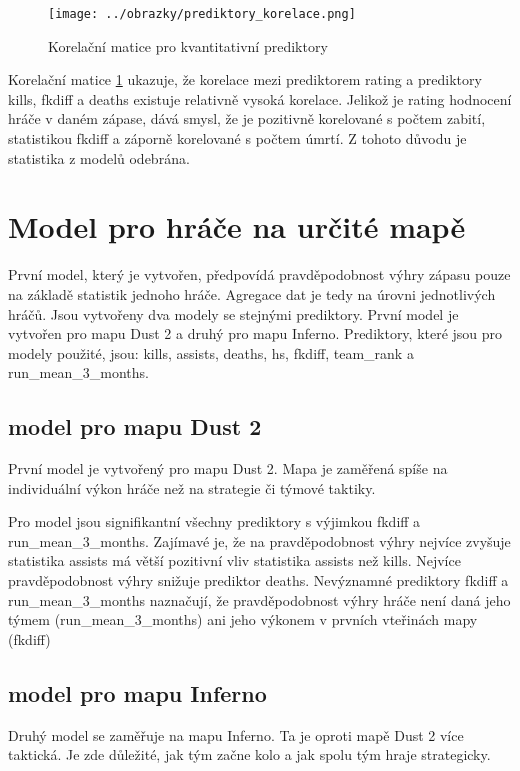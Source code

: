\begin{figure}[H]
    \centering
    \texttt{[image: ../obrazky/prediktory\_korelace.png]}
    \caption{Korelační matice pro kvantitativní prediktory} 
    \label{fig:korelacni_matice}
\end{figure}

Korelační matice \ref{fig:korelacni_matice} ukazuje, že korelace mezi prediktorem rating a prediktory kills, fkdiff a deaths existuje relativně vysoká korelace.
Jelikož je rating hodnocení hráče v daném zápase, dává smysl, že je pozitivně korelované s počtem zabití, statistikou fkdiff a záporně korelované s počtem úmrtí.
Z tohoto důvodu je statistika z modelů odebrána.

\newpage
\section{Model pro hráče na určité mapě}
První model, který je vytvořen, předpovídá pravděpodobnost výhry zápasu pouze na základě statistik jednoho hráče. Agregace dat je tedy na úrovni jednotlivých hráčů.
Jsou vytvořeny dva modely se stejnými prediktory. První model je vytvořen pro mapu Dust 2 a druhý pro mapu Inferno. Prediktory, které jsou pro modely použité, jsou:
kills, assists, deaths, hs, fkdiff, team\_rank a run\_mean\_3\_months.

\subsection{model pro mapu Dust 2}
První model je vytvořený pro mapu Dust 2. Mapa je zaměřená spíše na individuální výkon hráče než na strategie či týmové taktiky.


Pro model jsou signifikantní všechny prediktory s výjimkou fkdiff a run\_mean\_3\_months. Zajímavé je, že na pravděpodobnost výhry nejvíce zvyšuje statistika assists
má větší pozitivní vliv statistika assists než kills. Nejvíce pravděpodobnost výhry snižuje prediktor deaths. Nevýznamné prediktory fkdiff a run\_mean\_3\_months naznačují,
že pravděpodobnost výhry hráče není daná jeho týmem (run\_mean\_3\_months) ani jeho výkonem v prvních vteřinách mapy (fkdiff) 

\subsection{model pro mapu Inferno} \label{sec:model_pro_mapu_inferno}
Druhý model se zaměřuje na mapu Inferno. Ta je oproti mapě Dust 2 více taktická. Je zde důležité, jak tým začne kolo a jak spolu tým hraje strategicky.


